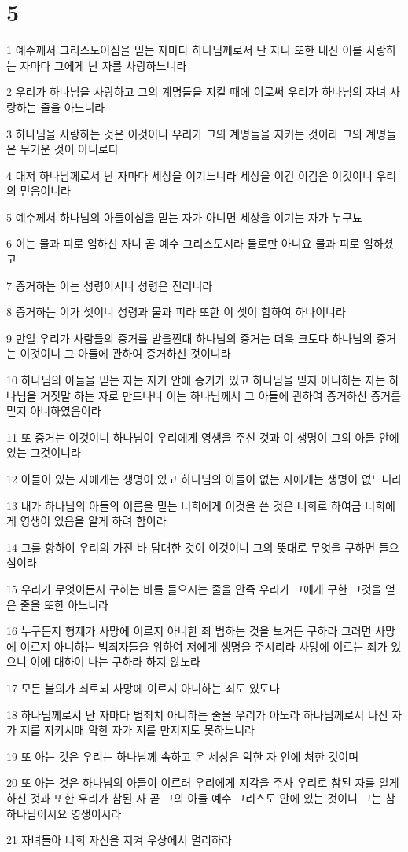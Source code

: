 \chapter{5}

\par 1 예수께서 그리스도이심을 믿는 자마다 하나님께로서 난 자니 또한 내신 이를 사랑하는 자마다 그에게 난 자를 사랑하느니라
\par 2 우리가 하나님을 사랑하고 그의 계명들을 지킬 때에 이로써 우리가 하나님의 자녀 사랑하는 줄을 아느니라
\par 3 하나님을 사랑하는 것은 이것이니 우리가 그의 계명들을 지키는 것이라 그의 계명들은 무거운 것이 아니로다
\par 4 대저 하나님께로서 난 자마다 세상을 이기느니라 세상을 이긴 이김은 이것이니 우리의 믿음이니라
\par 5 예수께서 하나님의 아들이심을 믿는 자가 아니면 세상을 이기는 자가 누구뇨
\par 6 이는 물과 피로 임하신 자니 곧 예수 그리스도시라 물로만 아니요 물과 피로 임하셨고
\par 7 증거하는 이는 성령이시니 성령은 진리니라
\par 8 증거하는 이가 셋이니 성령과 물과 피라 또한 이 셋이 합하여 하나이니라
\par 9 만일 우리가 사람들의 증거를 받을찐대 하나님의 증거는 더욱 크도다 하나님의 증거는 이것이니 그 아들에 관하여 증거하신 것이니라
\par 10 하나님의 아들을 믿는 자는 자기 안에 증거가 있고 하나님을 믿지 아니하는 자는 하나님을 거짓말 하는 자로 만드나니 이는 하나님께서 그 아들에 관하여 증거하신 증거를 믿지 아니하였음이라
\par 11 또 증거는 이것이니 하나님이 우리에게 영생을 주신 것과 이 생명이 그의 아들 안에 있는 그것이니라
\par 12 아들이 있는 자에게는 생명이 있고 하나님의 아들이 없는 자에게는 생명이 없느니라
\par 13 내가 하나님의 아들의 이름을 믿는 너희에게 이것을 쓴 것은 너희로 하여금 너희에게 영생이 있음을 알게 하려 함이라
\par 14 그를 향하여 우리의 가진 바 담대한 것이 이것이니 그의 뜻대로 무엇을 구하면 들으심이라
\par 15 우리가 무엇이든지 구하는 바를 들으시는 줄을 안즉 우리가 그에게 구한 그것을 얻은 줄을 또한 아느니라
\par 16 누구든지 형제가 사망에 이르지 아니한 죄 범하는 것을 보거든 구하라 그러면 사망에 이르지 아니하는 범죄자들을 위하여 저에게 생명을 주시리라 사망에 이르는 죄가 있으니 이에 대하여 나는 구하라 하지 않노라
\par 17 모든 불의가 죄로되 사망에 이르지 아니하는 죄도 있도다
\par 18 하나님께로서 난 자마다 범죄치 아니하는 줄을 우리가 아노라 하나님께로서 나신 자가 저를 지키시매 악한 자가 저를 만지지도 못하느니라
\par 19 또 아는 것은 우리는 하나님께 속하고 온 세상은 악한 자 안에 처한 것이며
\par 20 또 아는 것은 하나님의 아들이 이르러 우리에게 지각을 주사 우리로 참된 자를 알게 하신 것과 또한 우리가 참된 자 곧 그의 아들 예수 그리스도 안에 있는 것이니 그는 참 하나님이시요 영생이시라
\par 21 자녀들아 너희 자신을 지켜 우상에서 멀리하라


